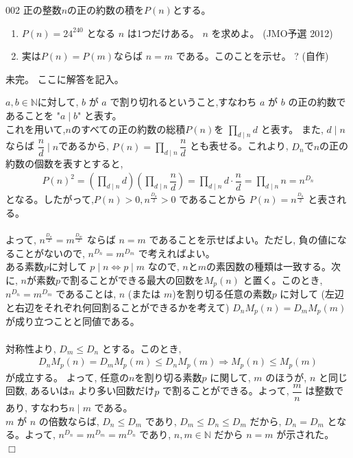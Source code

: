 \begin{thm}{002}{}{}
 正の整数$n$の正の約数の積を$P(n)$とする。
 \begin{enumerate}
  \item $P(n)=24^{240}$ となる $n$ は1つだけある。 $n$ を求めよ。  (JMO予選 2012)
  \item 実は$P(n)=P(m)$ならば $n=m$ である。このことを示せ。 \hosi ? (自作)
 \end{enumerate}
\end{thm}
未完。
ここに解答を記入。

$a,b\in\mathbb{N}$に対して, $b$ が $a$ で割り切れるということ,すなわち $a$ が $b$ の正の約数であることを "$a\mid b$" と表す。\\
これを用いて,$n$のすべての正の約数の総積$P(n)$を $\displaystyle\prod_{d\mid n}d$ と表す。 また, $d\mid n$ならば $\dfrac{n}{d}\mid n$であるから, $P(n)=\displaystyle\prod_{d\mid n}\dfrac{n}{d}$ とも表せる。これより, $D_n$で$n$の正の約数の個数を表すとすると,
\begin{eqnarray*}
P(n)^2 = \left(\displaystyle\prod_{d\mid n}d\right)\left(\displaystyle\prod_{d\mid n}\dfrac{n}{d}\right) = \displaystyle\prod_{d\mid n}d\cdot \dfrac{n}{d} = \displaystyle\prod_{d\mid n}n = n^{D_n}
\end{eqnarray*}
となる。したがって,$P(n)>0, n^{\frac{D_n}{2}}>0$ であることから $P(n)=n^{\frac{D_n}{2}}$ と表される。\\
\\
よって, $n^{\frac{D_n}{2}}=m^{\frac{D_m}{2}}$ ならば $n=m$ であることを示せばよい。ただし, 負の値になることがないので, $n^{D_n}=m^{D_m}$ で考えればよい。\\
ある素数$p$に対して $p\mid n\iff p\mid m$ なので, $n$と$m$の素因数の種類は一致する。次に, $n$が素数$p$で割ることができる最大の回数を$M_p(n)$ と置く。このとき, $n^{D_n}=m^{D_m}$ であることは, $n$ (または $m$)を割り切る任意の素数$p$ に対して (左辺と右辺をそれぞれ何回割ることができるかを考えて) $D_nM_p(n)=D_mM_p(m)$ が成り立つことと同値である。\\
\\
対称性より, $D_m\le D_n$ とする。このとき,
\begin{eqnarray*}
D_nM_p(n)=D_mM_p(m)\le D_nM_p(m) \Rightarrow M_p(n)\le M_p(m)
\end{eqnarray*}
が成立する。 よって, 任意の$n$を割り切る素数$p$ に関して, $m$ のほうが, $n$ と同じ回数, あるいは$n$ より多い回数だけ$p$ で割ることができる。よって, $\dfrac{m}{n}$ は整数であり, すなわち$n\mid m$ である。\\
$m$ が $n$ の倍数ならば,  $D_n\le D_m$ であり, $D_m\le D_n\le D_m$ だから, $D_n=D_m$ となる。よって, $n^{D_n}=m^{D_m}=m^{D_n}$ であり, $n,m\in\mathbb{N}$ だから $n=m$ が示された。　　$\Box$
